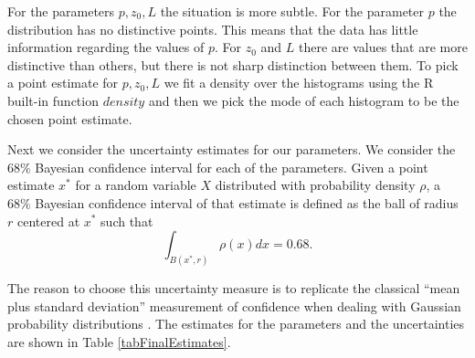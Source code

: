 \documentclass{sfuthesis}
\newcommand{\pars}{p,z_{0},L}
\begin{document}
For the parameters $\pars$ the situation is more subtle. For the parameter $p$
the distribution has no distinctive points. This means that the data has little information
regarding the values of $p$. For  $z_{0}$ and $L$
there are values that are more distinctive than others, but there is not  sharp
distinction between them. To pick a point estimate
for $\pars$ we fit a density over the histograms using the R built-in 
function $density$ and then we pick the mode of each histogram to be 
the chosen point estimate.

Next we consider the uncertainty estimates for our parameters. We consider  the $68\%$ Bayesian confidence interval
for each of the parameters. Given a point estimate $x^{*}$  for a random variable $X$ distributed with
 probability density $\rho$, a $68\%$ Bayesian confidence interval of that estimate 
is defined as the ball of radius $r$ centered at $x^{*}$ such that
\begin{equation*}
\int_{B(x^{*},r)}\rho(x)dx=0.68.
\end{equation*} 

The reason to choose this uncertainty measure is to replicate the classical ``mean plus standard deviation''
measurement of confidence when dealing with Gaussian  probability distributions \cite{bulmer1979principles}.
\noindent The estimates for the parameters and the uncertainties are shown in Table \ref{tabFinalEstimates}.
\end{document}
